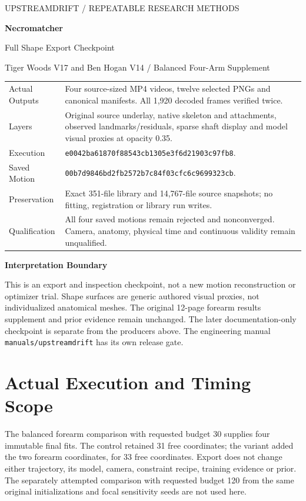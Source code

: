 \documentclass[11pt,letterpaper]{article}
\newcommand{\code}[1]{\nolinkurl{#1}}\newcommand{\hash}[1]{{\footnotesize\nolinkurl{#1}}}
\begin{document}
\hypersetup{pageanchor=false}
\begin{titlepage}\thispagestyle{empty}\vspace*{.45in}
{\large\textcolor{accent}{UPSTREAMDRIFT / REPEATABLE RESEARCH METHODS}}\par\vspace{.25in}
{\Huge\bfseries\textcolor{ink}{Necromatcher}}\par\vspace{.18in}
{\LARGE Full Shape Export Checkpoint}\par\vspace{.3in}
{\large Tiger Woods V17 and Ben Hogan V14 / Balanced Four-Arm Supplement}\par\vspace{.35in}
\begin{tabular}{@{}p{1.2in}p{4.7in}@{}}\toprule
Actual Outputs & Four source-sized MP4 videos, twelve selected PNGs and canonical manifests. All 1,920 decoded frames verified twice.\\
Layers & Original source underlay, native skeleton and attachments, observed landmarks/residuals, sparse shaft display and model visual proxies at opacity 0.35.\\
Execution & \hash{e0042ba61870f88543cb1305e3f6d21903c97fb8}.\\
Saved Motion & \hash{00b7d9846bd2fb2572b7c84f03cfc6c9699323cb}.\\
Preservation & Exact 351-file library and 14,767-file source snapshots; no fitting, registration or library run writes.\\
Qualification & All four saved motions remain rejected and nonconverged. Camera, anatomy, physical time and continuous validity remain unqualified.\\\bottomrule
\end{tabular}
\vfill\textcolor{ink}{\textbf{Interpretation Boundary}}\par
This is an export and inspection checkpoint, not a new motion reconstruction or optimizer trial.
Shape surfaces are generic authored visual proxies, not individualized anatomical meshes.
The original 12-page forearm results supplement and prior evidence remain unchanged.
The later documentation-only checkpoint is separate from the producers above.
The engineering manual \code{manuals/upstreamdrift} has its own release gate.
\end{titlepage}\hypersetup{pageanchor=true}
\section{Actual Execution and Timing Scope}
The balanced forearm comparison with requested budget 30 supplies four immutable final fits.
The control retained 31 free coordinates; the variant added the two forearm coordinates,
for 33 free coordinates. Export does not change either trajectory, its model, camera,
constraint recipe, training evidence or prior. The separately attempted comparison with requested budget 120
from the same original initializations and focal sensitivity seeds are not used here.
\end{document}
